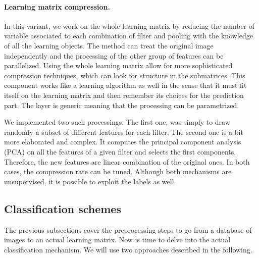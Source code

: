 \documentclass[a4paper]{report}
\begin{document}
		\paragraph{Learning matrix compression.}
		In this variant, we work on the whole learning matrix by reducing the number of variable associated to each combination of filter and pooling with the knowledge of all the learning objects. The method can treat the original image independently and the processing of the other group of features can be parallelized. Using the whole learning matrix allow for more sophisticated compression techniques, which can look for structure in the submatrices. This component works like a learning algorithm as well in the sense that it must fit itself on the learning matrix and then remember its choices for the prediction part.
		The layer is generic meaning that the processing can be parametrized.
		\par
		We implemented two such processings. The first one, was simply to draw randomly a subset of different features for each filter. The second one is a bit more elaborated and complex. It computes the principal component analysis (PCA) on all the features of a given filter and selects the first components. Therefore, the new features are linear combination of the original ones. In both cases, the compression rate can be tuned. Although both mechanisms are unsupervised, it is possible to exploit the labels as well.
		
		\subsection{Classification schemes}
		The previous subsections cover the preprocessing steps to go from a database of images to an actual learning matrix. Now is time to delve into the actual classification mechanism. We will use two approaches described in the following. 
		
\end{document}
